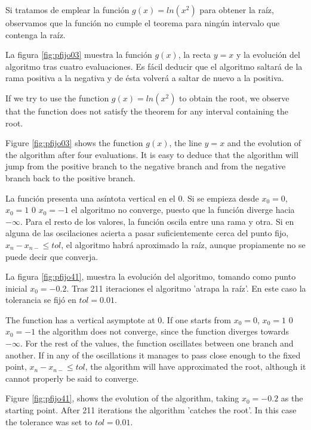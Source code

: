 \begin{paracol}{2}
    
Si tratamos de emplear la función $g(x)=ln(x^2)$ para obtener la raíz, observamos que la función no cumple el teorema para ningún intervalo que contenga la raíz. 

La figura \ref{fig:pfijo03} muestra la función $g(x)$, la recta $y=x$ y la evolución del algoritmo tras cuatro evaluaciones. Es fácil deducir que el algoritmo saltará de la rama positiva a la negativa y de ésta volverá a saltar de nuevo a la positiva. 

\switchcolumn

If we try to use the function $g(x)=ln(x^2)$ to obtain the root, we observe that the function does not satisfy the theorem for any interval containing the root. 

Figure \ref{fig:pfijo03} shows the function $g(x)$, the line $y=x$ and the evolution of the algorithm after four evaluations. It is easy to deduce that the algorithm will jump from the positive branch to the negative branch and from the negative branch back to the positive branch.

\end{paracol}

\begin{paracol}{2}
La función presenta una asíntota vertical en el $0$. Si se empieza desde $x_0=0$, $x_0=1$ 0 $x_0=-1$ el algoritmo no converge, puesto que la función diverge hacia $-\infty$. Para el resto de los valores, la función oscila entre una rama y otra. Si en alguna de las oscilaciones acierta a pasar suficientemente cerca del punto fijo, $x_n-x_{n-} \leq tol$, el algoritmo habrá aproximado la raíz, aunque propiamente no se puede decir que converja.

 La figura \ref{fig:pfijo41}, muestra la evolución del algoritmo, tomando como punto inicial $x_0=-0.2$.  Tras 211 iteraciones el algoritmo 'atrapa la raíz'. En este caso la tolerancia se fijó en $tol=0.01$.  
 
 \switchcolumn
 The function has a vertical asymptote at $0$. If one starts from $x_0=0$, $x_0=1$ 0 $x_0=-1$ the algorithm does not converge, since the function diverges towards $-\infty$. For the rest of the values, the function oscillates between one branch and another. If in any of the oscillations it manages to pass close enough to the fixed point, $x_n-x_{n-} \leq tol$, the algorithm will have approximated the root, although it cannot properly be said to converge.

 Figure \ref{fig:pfijo41}, shows the evolution of the algorithm, taking $x_0=-0.2$ as the starting point. After 211 iterations the algorithm 'catches the root'. In this case the tolerance was set to $tol=0.01$.
\end{paracol}

